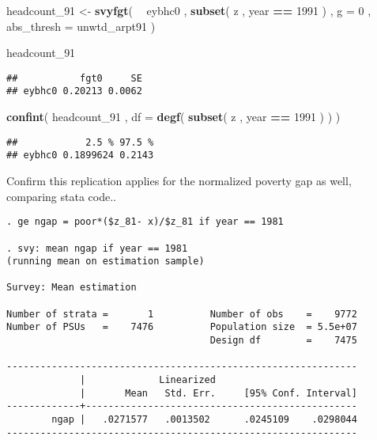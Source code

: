 \documentclass[]{book}
\newenvironment{Shaded}{\begin{snugshade}}{\end{snugshade}}
\newcommand{\DataTypeTok}[1]{\textcolor[rgb]{0.13,0.29,0.53}{#1}}
\newcommand{\DecValTok}[1]{\textcolor[rgb]{0.00,0.00,0.81}{#1}}
\newcommand{\KeywordTok}[1]{\textcolor[rgb]{0.13,0.29,0.53}{\textbf{#1}}}
\newcommand{\NormalTok}[1]{#1}
\newcommand{\OperatorTok}[1]{\textcolor[rgb]{0.81,0.36,0.00}{\textbf{#1}}}
\newcommand{\StringTok}[1]{\textcolor[rgb]{0.31,0.60,0.02}{#1}}
\begin{document}
\begin{Shaded}
\begin{Highlighting}[]
\NormalTok{headcount_}\DecValTok{91}\NormalTok{ <-}\StringTok{ }
\StringTok{    }\KeywordTok{svyfgt}\NormalTok{( }
        \OperatorTok{~}\StringTok{ }\NormalTok{eybhc0 , }
        \KeywordTok{subset}\NormalTok{( z , year }\OperatorTok{==}\StringTok{ }\DecValTok{1991}\NormalTok{ ) , }
        \DataTypeTok{g =} \DecValTok{0}\NormalTok{ , }
        \DataTypeTok{abs_thresh =}\NormalTok{ unwtd_arpt91 }
\NormalTok{    )}

\NormalTok{headcount_}\DecValTok{91}
\end{Highlighting}
\end{Shaded}

\begin{verbatim}
##           fgt0     SE
## eybhc0 0.20213 0.0062
\end{verbatim}

\begin{Shaded}
\begin{Highlighting}[]
\KeywordTok{confint}\NormalTok{( headcount_}\DecValTok{91}\NormalTok{ , }\DataTypeTok{df =} \KeywordTok{degf}\NormalTok{( }\KeywordTok{subset}\NormalTok{( z , year }\OperatorTok{==}\StringTok{ }\DecValTok{1991}\NormalTok{ ) ) )}
\end{Highlighting}
\end{Shaded}

\begin{verbatim}
##            2.5 % 97.5 %
## eybhc0 0.1899624 0.2143
\end{verbatim}

Confirm this replication applies for the normalized poverty gap as well, comparing stata code..

\begin{verbatim}
. ge ngap = poor*($z_81- x)/$z_81 if year == 1981

. svy: mean ngap if year == 1981
(running mean on estimation sample)

Survey: Mean estimation

Number of strata =       1          Number of obs    =    9772
Number of PSUs   =    7476          Population size  = 5.5e+07
                                    Design df        =    7475

--------------------------------------------------------------
             |             Linearized
             |       Mean   Std. Err.     [95% Conf. Interval]
-------------+------------------------------------------------
        ngap |   .0271577   .0013502      .0245109    .0298044
--------------------------------------------------------------
\end{verbatim}
\end{document}
